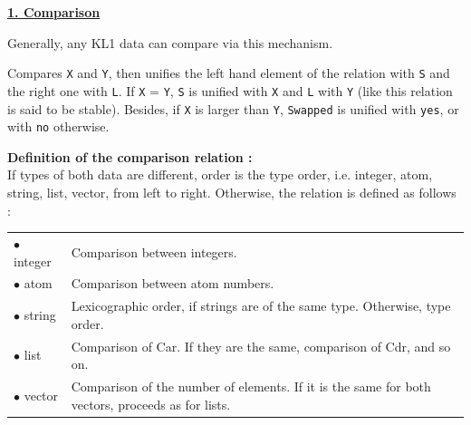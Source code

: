 \noindent\underline{\bf 1. Comparison}\vspace{1ex}\par
{}
Generally, any KL1 data can compare via this mechanism.
\begin{itemize}

Compares \verb|X| and \verb|Y|, then
unifies the left hand element of the relation with \verb|S| and the right
one with \verb|L|. If \verb|X| = \verb|Y|, \verb|S| is unified with \verb|X|
and \verb|L| with \verb|Y| (like this relation is said to be stable).
Besides, if \verb|X| is larger than \verb|Y|,
\verb|Swapped| is unified with \verb|yes|, or with \verb|no| otherwise.
\vspace{1ex}

{\bf Definition of the comparison relation :}\\
If types of both data are different, order is the type order, i.e. integer,
atom, string, list, vector, from left to right. Otherwise, the relation is
defined as follows :
\vspace{1ex}

\hspace*{10mm}\begin{tabular}{l@{$\cdots$}p{120mm}}
$\bullet$ integer & Comparison between integers.\\
$\bullet$ atom  & Comparison between atom numbers.\\
$\bullet$ string & Lexicographic order, if strings are of the same type.
			Otherwise, type order.\\
$\bullet$ list & Comparison of Car. If they are the same, comparison of Cdr,
						and so on.\\
$\bullet$ vector & Comparison of the number of elements.
		If it is the same for both vectors, proceeds as for lists.\\
\end{tabular}
\end{itemize}
\vspace{1ex}


